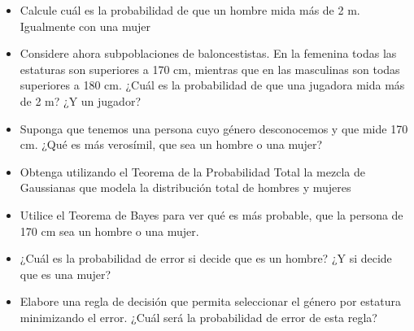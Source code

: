 \documentclass[11pt]{article}
\providecommand{\tightlist}{%
      \setlength{\itemsep}{0pt}\setlength{\parskip}{0pt}}
\begin{document}
\begin{itemize}
\tightlist
\item
  Calcule cuál es la probabilidad de que un hombre mida más de 2 m.
  Igualmente con una mujer
\item
  Considere ahora subpoblaciones de baloncestistas. En la femenina todas
  las estaturas son superiores a 170 cm, mientras que en las masculinas
  son todas superiores a 180 cm. ¿Cuál es la probabilidad de que una
  jugadora mida más de 2 m? ¿Y un jugador?
\item
  Suponga que tenemos una persona cuyo género desconocemos y que mide
  170 cm. ¿Qué es más verosímil, que sea un hombre o una mujer?
\item
  Obtenga utilizando el Teorema de la Probabilidad Total la mezcla de
  Gaussianas que modela la distribución total de hombres y mujeres
\item
  Utilice el Teorema de Bayes para ver qué es más probable, que la
  persona de 170 cm sea un hombre o una mujer.
\item
  ¿Cuál es la probabilidad de error si decide que es un hombre? ¿Y si
  decide que es una mujer?
\item
  Elabore una regla de decisión que permita seleccionar el género por
  estatura minimizando el error. ¿Cuál será la probabilidad de error de
  esta regla?
\end{itemize}

    
    
    
    
\end{document}
